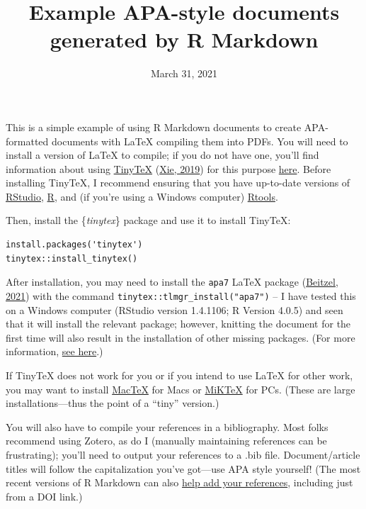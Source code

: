 \documentclass[jou]{apa7}
\title{Example APA-style documents generated by R Markdown}
\date{March 31, 2021}
\begin{document}
\maketitle

This is a simple example of using R Markdown documents to create
APA-formatted documents with LaTeX compiling them into PDFs. You will
need to install a version of LaTeX to compile; if you do not have one,
you'll find information about using
\href{https://yihui.org/tinytex/}{TinyTeX}
(\protect\hyperlink{ref-xie2019}{Xie, 2019}) for this purpose
\href{https://bookdown.org/yihui/rmarkdown-cookbook/install-latex.html}{here}.
Before installing TinyTeX, I recommend ensuring that you have up-to-date
versions of
\href{https://www.rstudio.com/products/rstudio/download/}{RStudio},
\href{https://cran.r-project.org/}{R}, and (if you're using a Windows
computer) \href{https://cran.r-project.org/bin/windows/Rtools/}{Rtools}.

Then, install the \{\emph{tinytex}\} package and use it to install
TinyTeX:

\begin{verbatim}
install.packages('tinytex')
tinytex::install_tinytex()
\end{verbatim}

After installation, you may need to install the \texttt{apa7} LaTeX
package (\protect\hyperlink{ref-weiss2021}{Beitzel, 2021}) with the
command \texttt{tinytex::tlmgr\_install("apa7")} -- I have tested this
on a Windows computer (RStudio version 1.4.1106; R Version 4.0.5) and
seen that it will install the relevant package; however, knitting the
document for the first time will also result in the installation of
other missing packages. (For more information,
\href{https://bookdown.org/yihui/rmarkdown-cookbook/install-latex-pkgs.html}{see
here}.)

If TinyTeX does not work for you or if you intend to use LaTeX for other
work, you may want to install \href{http://tug.org/mactex/}{MacTeX} for
Macs or \href{https://miktex.org/}{MiKTeX} for PCs. (These are large
installations---thus the point of a ``tiny'' version.)

You will also have to compile your references in a bibliography. Most
folks recommend using Zotero, as do I (manually maintaining references
can be frustrating); you'll need to output your references to a .bib
file. Document/article titles will follow the capitalization you've
got---use APA style yourself! (The most recent versions of R Markdown
can also
\href{https://rmarkdown.rstudio.com/authoring_bibliographies_and_citations.html}{help
add your references}, including just from a DOI link.)
\end{document}
